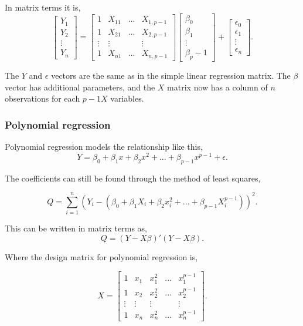\noindent In matrix terms it is,  
$$
\left[
\begin{array}{c}
	Y_1 \\ 
	Y_2 \\ 
	\vdots \\
	Y_n 
\end{array}
\right]
=
\left[
\begin{array}{cccc}
	1 & X_{11} & ... & X_{1, p-1} \\ 
	1 & X_{21} & ... & X_{2, p-1} \\ 
	\vdots & \vdots &  & \vdots \\
	1 & X_{n1} & ... & X_{n, p-1}
\end{array}
\right]
\left[
\begin{array}{c}
	\beta_0 \\ 
	\beta_1 \\
	\vdots \\
	\beta_p-1 
\end{array}
\right]
+
\left[
\begin{array}{c}
	\epsilon_0 \\ 
	\epsilon_1 \\
	\vdots \\
	\epsilon_n 
\end{array}
\right].
$$

\noindent The $Y$ and $\epsilon$ vectors are the same as in the simple linear regression matrix. The $\beta$ vector has additional parameters, and the $X$ matrix now has a column of $n$ observations for each $p-1 X$ variables. 

\subsubsection{Polynomial regression}
Polynomial regression models the relationship like this, 
$$Y=\beta_0 + \beta_1 x + \beta_2 x^2	+ ... + \beta_{p-1} x^{p-1}+ \epsilon .$$

\noindent The coefficients can still be found through the method of least squares,

$$Q=\sum_{i=1}^{n}(Y_i -(\beta_0 + \beta_1 X_i + \beta_2 x_i^2 + ... + \beta_{p-1}X_{i}^{p-1}))^2 .$$
\newline

\noindent This can be written in matrix terms as,
$$Q=(Y-X\beta)' (Y-X\beta) .$$

\noindent Where the design matrix for polynomial regression is, 

$$ X=
\left[
\begin{array}{ccccc}
	1&x_1&x_1^2&...&x_1^{p-1}\\ 
	1&x_2&x_2^2&...&x_2^{p-1} \\
	\vdots & \vdots &\vdots &&\vdots\\
	1&x_n&x_n^2&...&x_n^{p-1} 
\end{array}
\right].
$$

